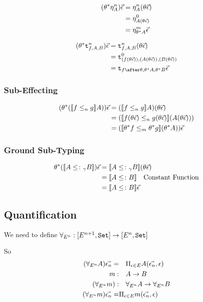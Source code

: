 \documentclass{report}
\begin{document}
\begin{align}
    (\theta^*\eta_{A}^n)\vec{\epsilon} & = \eta_{A}^n(\theta\vec{\epsilon}) \\
    & = \eta_{A(\theta\vec{\epsilon})}^0\\
    & = \eta_{\theta^* A}^m\vec{\epsilon}\\
\end{align}

\begin{align}
    (\theta\star \tstrengthn{f}{A}{B})\ev & = \tstrengthn{f}{A}{B}(\theta \ev)\\
    & = \tstrengthz{(f(\theta\ev))}{(A(\theta\ev))}{(B(\theta\ev))}\\
    & = \tstrength{f\after\theta}{\theta\star A}{\theta\star B}\ev\\
\end{align}

\subsubsection{Sub-Effecting}
\begin{align}
    (\theta\star(\dsen{f}{g} A))\ev & = (\dsen{f}{g} A)(\theta \ev)\\
    & = (\dsen{f(\theta\ev)}{g(\theta\ev)}(A(\theta\ev)))\\
    & = (\dsem{\theta\star f}{\theta\star g} (\theta\star A)) \ev\\
\end{align}

\subsubsection{Ground Sub-Typing}
\begin{align}
    \theta\star(\deno{A\subtypeg B})\ev  & = \deno{A\subtypeg B}(\theta\ev)\\
    & = \deno{A\subtype B} \qt{Constant Function}\\
    & = \deno{A\subtype B} \ev\\
\end{align}

\subsection{Quantification}
We need to define $\forall_{E^n}: [E^{n+1}, \texttt{Set}]\rightarrow[E^n, \texttt{Set}]$

So
\begin{align}
    (\forall_{E^n} A)\vec{\epsilon_n} =&\quad \Pi_{\epsilon\in E} A(\vec{\epsilon_n}, \epsilon)\\
    m:&\quad A\rightarrow B\\
    (\forall_{E^n} m):&\quad \forall_{E^n} A\rightarrow \forall_{E^n} B\\
    (\forall_{E^n} m)\vec{\epsilon_n} =&\Pi_{\epsilon\in E} m(\vec{\epsilon_n}, \epsilon)\\
\end{align}
\end{document}
